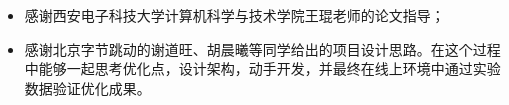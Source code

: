\begin{itemize}
    \item 感谢西安电子科技大学计算机科学与技术学院王琨老师的论文指导；
    \item 感谢北京字节跳动的谢道旺、胡晨曦等同学给出的项目设计思路。在这个过程中能够一起思考优化点，设计架构，动手开发，并最终在线上环境中通过实验数据验证优化成果。
\end{itemize}